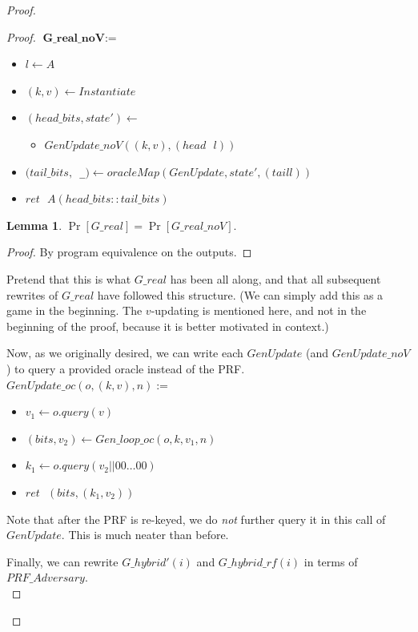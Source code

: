 \documentclass[12pt,lot, lof]{puthesis}
\newenvironment{game}
{ \begin{itemize}[noitemsep,nolistsep] 
}
{ \end{itemize}                  }
\newcommand{\s} {\textrm{ }}
\newcommand{\li} {\lstinline}
\newcommand{\lar}{\leftarrow}
\newtheorem{lem}{Lemma}[thm]
\begin{document}
\begin{proof}
\begin{proof}
$\textbf{G\_real\_noV} := $
\begin{game}
\item[] $l \leftarrow A$
\item[] $(k,v) \leftarrow Instantiate$
\item[] $(head\_bits, state') \lar$
  \begin{game}
    \item[]  $GenUpdate\_noV((k, v), (head \s l))$
  \end{game}
\item[] $(tail\_bits, $\li| _|$) \lar oracleMap(GenUpdate,state',(tail l))$
\item[] $ret \s A(head\_bits :: tail\_bits)$ \\
\end{game}

\begin{lem} $\Pr[G\_real] = \Pr[G\_real\_noV].$ \end{lem}
\begin{proof} By program equivalence on the outputs. \end{proof}

Pretend that this is what $G\_real$ has been all along, and that all subsequent rewrites of $G\_real$ have followed this structure. (We can simply add this as a game in the beginning. The $v$-updating is mentioned here, and not in the beginning of the proof, because it is better motivated in context.) 

Now, as we originally desired, we can write each $GenUpdate$ (and $GenUpdate\_noV$) to query a provided oracle instead of the PRF. \\

$GenUpdate\_oc(o, (k,v), n) :=$
\begin{game}
\item[] $v_1 \lar o.query(v)$
\item[] $(bits, v_2) \lar Gen\_loop\_oc(o, k, v_1, n)$
\item[] $k_1 \lar o.query(v_2 || 00 \ldots 00)$
\item[] $ret \s (bits, (k_1, v_2))$\\
\end{game}

Note that after the PRF is re-keyed, we do \emph{not} further query it in this call of $GenUpdate$. This is much neater than before.

Finally, we can rewrite $G\_hybrid'(i)$ and $G\_hybrid\_rf(i)$ in terms of $PRF\_Adversary$. \\


\end{proof}
\end{proof}
\end{document}
